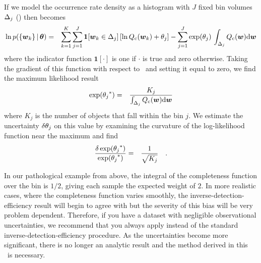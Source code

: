 If we model the occurrence rate density as a histogram with $J$ fixed bin
volumes ${\Delta}_j$ () then  becomes
\begin{eqnarray}
\ln p(\{{\boldsymbol{w}}_k\}\,|\,{\boldsymbol{{\theta}}}) &=&
    \sum_{k=1}^K \sum_{j=1}^J \mathbf{1}[{\boldsymbol{w}}_k \in
        {\ensuremath{\Delta}}_j]\,[\ln{\ensuremath{Q_\mathrm{c}}}({\boldsymbol{w}}_k)+{\theta}_j]
    -\sum_{j=1}^J\exp({\theta}_j)\,
        \int_{{\Delta}_j} {Q_\mathrm{c}}({\boldsymbol{w}})\mathrm{d}{\boldsymbol{w}}
\end{eqnarray}
where the indicator function $\mathbf{1}[\cdot]$ is one if $\cdot$ is true and
zero otherwise.
Taking the gradient of this function with respect to \ratepars\ and setting it
equal to zero, we find the maximum likelihood result
\begin{eqnarray}\eqlabel{ml-ide}
\exp ({\ratepar_j}^*) &=&
\frac{K_j}{\int_{\binarea_j} \completeness(\entry)\dd\entry}
\end{eqnarray}
where $K_j$ is the number of objects that fall within the bin $j$.
We estimate the uncertainty $\delta{\ensuremath{\theta}}_j$ on this value by examining the
curvature of the log-likelihood function near the maximum and find
\begin{eqnarray}
\frac{\delta\exp({{\theta}_j}^*)}{\exp({{\theta}_j}^*)}
&=& \frac{1}{\sqrt{K_j}}
\quad.
\end{eqnarray}

In our pathological example from above, the integral of the completeness
function over the bin is $1/2$, giving each sample the expected weight of $2$.
In more realistic cases, where the completeness function varies smoothly, the
inverse-detection-efficiency result will begin to agree with  but
the severity of this bias will be very problem dependent.
Therefore, if you have a dataset with negligible observational uncertainties,
we recommend that you always apply  instead of the standard
inverse-detection-efficiency procedure.
As the uncertainties become more significant, there is no longer an analytic
result and the method derived in this \paper\ is necessary.
